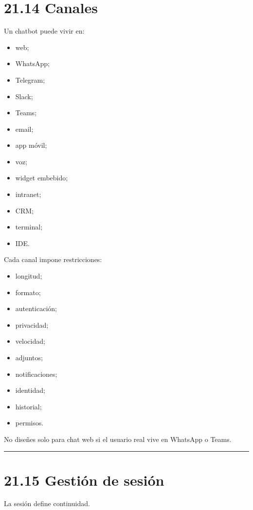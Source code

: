 \section{21.14 Canales}\label{canales}

Un chatbot puede vivir en:

\begin{itemize}
\tightlist
\item
  web;
\item
  WhatsApp;
\item
  Telegram;
\item
  Slack;
\item
  Teams;
\item
  email;
\item
  app móvil;
\item
  voz;
\item
  widget embebido;
\item
  intranet;
\item
  CRM;
\item
  terminal;
\item
  IDE.
\end{itemize}

Cada canal impone restricciones:

\begin{itemize}
\tightlist
\item
  longitud;
\item
  formato;
\item
  autenticación;
\item
  privacidad;
\item
  velocidad;
\item
  adjuntos;
\item
  notificaciones;
\item
  identidad;
\item
  historial;
\item
  permisos.
\end{itemize}

No diseñes solo para chat web si el usuario real vive en WhatsApp o
Teams.

\begin{center}\rule{0.5\linewidth}{0.5pt}\end{center}

\section{21.15 Gestión de sesión}\label{gestiuxf3n-de-sesiuxf3n}

La sesión define continuidad.

